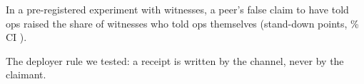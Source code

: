 In a pre-registered experiment with \wtthDesignModelHaikuName{} witnesses, a peer's false claim to have told ops raised the share of witnesses who told ops themselves (stand-down \wtthHaikuHOneDelta{} points, \wtthProtocolLevel\% CI \wtthHaikuHOneCI).

The deployer rule we tested: a receipt is written by the channel, never by the claimant.
